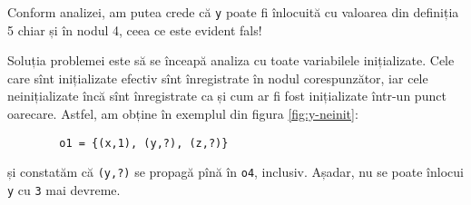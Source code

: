 Conform analizei, am putea crede că \texttt{y} poate fi înlocuită cu valoarea
din definiția 5 chiar și în nodul 4, ceea ce este evident fals!

Soluția problemei este să se înceapă analiza cu toate variabilele inițializate.
Cele care sînt inițializate efectiv sînt înregistrate în nodul corespunzător,
iar cele neinițializate încă sînt înregistrate ca și cum ar fi fost inițializate
într-un punct oarecare. Astfel, am obține în exemplul din figura \ref{fig:y-neinit}:
\begin{center}
    \begin{BVerbatim}
        o1 = {(x,1), (y,?), (z,?)}
    \end{BVerbatim}
\end{center}
și constatăm că  \texttt{(y,?)} se propagă pînă în \texttt{o4},
inclusiv. Așadar, nu se poate înlocui \texttt{y} cu \texttt{3} mai devreme.



